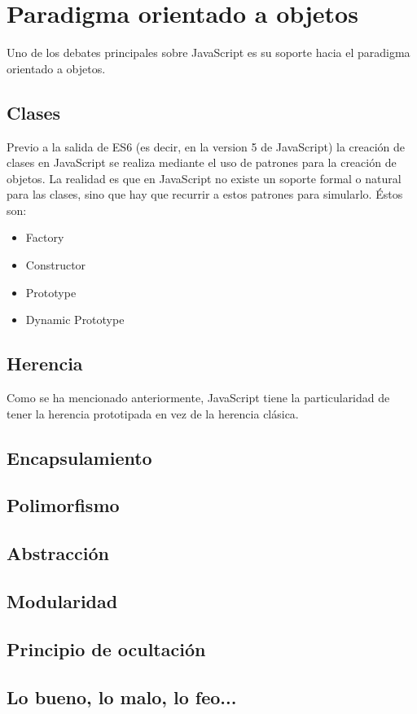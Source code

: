 \chapter{Paradigma orientado a objetos}

\label{Chapter4}


Uno de los debates principales sobre JavaScript es su soporte hacia el paradigma orientado a objetos.


\section{Clases}


Previo a la salida de ES6 (es decir, en la version 5 de JavaScript) la creación de clases en JavaScript se realiza mediante el uso de patrones para la creación de objetos. La realidad es que en JavaScript no existe un soporte formal o natural para las clases, sino que hay que recurrir a estos patrones para simularlo. Éstos son:

\begin{itemize}
	\item Factory
	\item Constructor
	\item Prototype
	\item Dynamic Prototype
\end{itemize}

\section{Herencia}

Como se ha mencionado anteriormente, JavaScript tiene la particularidad de tener la herencia prototipada en vez de la herencia clásica.



\section{Encapsulamiento}

\section{Polimorfismo}

\section{Abstracción}

\section{Modularidad}

\section{Principio de ocultación}

\section{Lo bueno, lo malo, lo feo...}